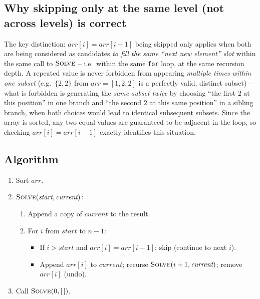 \subsection*{Why skipping only at the same level (not across levels) is correct}

The key distinction: $\textit{arr}[i] = \textit{arr}[i-1]$ being skipped
only applies when both are being considered as candidates \emph{to fill
the same ``next new element'' slot} within the same call to
$\textsc{Solve}$ -- i.e.\ within the same \texttt{for} loop, at the same
recursion depth. A repeated value is never forbidden from appearing
\emph{multiple times within one subset} (e.g.\ $\{2,2\}$ from
$\textit{arr}=[1,2,2]$ is a perfectly valid, distinct subset) -- what is
forbidden is generating the \emph{same subset twice} by choosing ``the
first $2$ at this position'' in one branch and ``the second $2$ at this
same position'' in a sibling branch, when both choices would lead to
identical subsequent subsets. Since the array is sorted, any two equal
values are guaranteed to be adjacent in the loop, so checking
$\textit{arr}[i] = \textit{arr}[i-1]$ exactly identifies this situation.

\subsection*{Algorithm}

\begin{enumerate}
  \item Sort $\textit{arr}$.
  \item $\textsc{Solve}(\textit{start}, \textit{current})$:
  \begin{enumerate}
    \item Append a copy of $\textit{current}$ to the result.
    \item For $i$ from $\textit{start}$ to $n-1$:
    \begin{itemize}
      \item If $i>\textit{start}$ and $\textit{arr}[i] =
            \textit{arr}[i-1]$: skip (continue to next $i$).
      \item Append $\textit{arr}[i]$ to $\textit{current}$; recurse
            $\textsc{Solve}(i+1, \textit{current})$; remove
            $\textit{arr}[i]$ (undo).
    \end{itemize}
  \end{enumerate}
  \item Call $\textsc{Solve}(0, [\,])$.
\end{enumerate}

